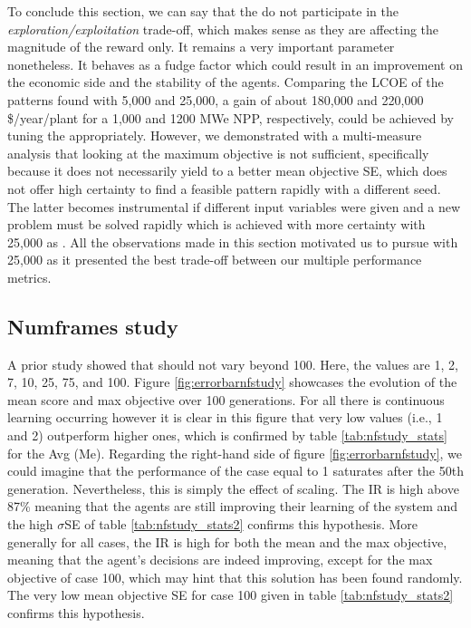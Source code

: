 To conclude this section, we can say that the  do not participate in the \textit{exploration/exploitation} trade-off, which makes sense as they are affecting the magnitude of the reward only. It remains a very important parameter nonetheless. It behaves as a fudge factor which could result in an improvement on the economic side and the stability of the agents. Comparing the LCOE of the patterns found with  5,000 and 25,000, a gain of about 180,000 and 220,000 \$/year/plant for a 1,000 and 1200 MWe NPP, respectively, could be achieved by tuning the  appropriately. However, we demonstrated with a multi-measure analysis that looking at the maximum objective is not sufficient, specifically because it does not necessarily yield to a better mean objective SE, which does not offer high certainty to find a feasible pattern rapidly with a different seed. The latter becomes instrumental if different input variables were given and a new problem must be solved rapidly which is achieved with more certainty with 25,000 as . All the observations made in this section motivated us to pursue with 25,000 as it presented the best trade-off between our multiple performance metrics.

\subsection{Numframes  study}
\label{sec:nf_study}
A prior study \cite{radaideh2023NEORL} showed that  should not vary beyond 100. Here, the values are 1, 2, 7, 10, 25, 75, and 100. Figure \ref{fig:errorbarnfstudy} showcases the evolution of the mean score and max objective over 100 generations. For all  there is continuous learning occurring however it is clear in this figure that very low  values (i.e., 1 and 2) outperform higher ones, which is confirmed by table \ref{tab:nfstudy_stats} for the Avg (Me). Regarding the right-hand side of figure \ref{fig:errorbarnfstudy}, we could imagine that the performance of the case  equal to 1 saturates after the 50th generation. Nevertheless, this is simply the effect of scaling. The IR is high above 87\% meaning that the agents are still improving their learning of the system and the high $\sigma$SE of table \ref{tab:nfstudy_stats2} confirms this hypothesis. More generally for all cases, the IR is high for both the mean and the max objective, meaning that the agent's decisions are indeed improving, except for the max objective of case 100, which may hint that this solution has been found randomly. The very low mean objective SE for case 100 given in table \ref{tab:nfstudy_stats2} confirms this hypothesis. 

